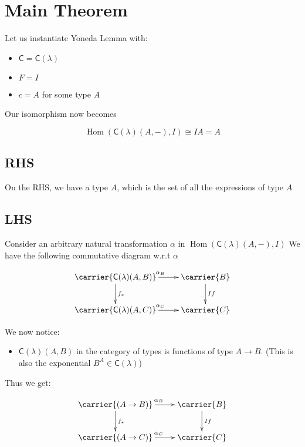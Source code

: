 \documentclass[11pt]{article}
\begin{document}
\section{Main Theorem}
\label{sec:orgbb482da}

Let us instantiate Yoneda Lemma with:
\begin{itemize}
\item \(\mathsf C = \mathsf C (\lambda)\)
\item \(F = I\)
\item \(c = A\) for some type \(A\)
\end{itemize}

Our isomorphism now becomes

\[\operatorname{Hom}(\mathsf C (\lambda) (A, {-}), I) \cong I A = A \]

\subsection{RHS}
\label{sec:org1dd8122}
On the RHS, we have a type \(A\), which is the set of all the expressions of type \(A\)

\subsection{LHS}
\label{sec:org2f2fb4e}
Consider an arbitrary natural transformation \(\alpha\) in \(\operatorname{Hom}(\mathsf C (\lambda) (A, {-}), I)\)
We have the following commutative diagram w.r.t \(\alpha\)

\begin{equation*}
\xymatrix{
\carrier{\mathsf C (\lambda) (A, B)}
\ar[r]^{\alpha_B}^{}
\ar[d]^{f_*}
&
\carrier{B}
\ar[d]^{If}
\\
\carrier{\mathsf C (\lambda) (A, C)}
\ar[r]^{\alpha_C}^{}
&
\carrier{C}
}
\end{equation*}

We now notice:
\begin{itemize}
\item \(\mathsf C (\lambda) (A, B)\) in the category of types is functions of type \(A \to B\). (This is also the exponential \(B^A \in \mathsf C(\lambda)\))
\end{itemize}

Thus we get:

\begin{equation*}
\xymatrix{
\carrier{(A \to B)}
\ar[r]^{\alpha_B}^{}
\ar[d]^{f_*}
&
\carrier{B}
\ar[d]^{If}
\\
\carrier{(A \to C)}
\ar[r]^{\alpha_C}^{}
&
\carrier{C}
}
\end{equation*}
\end{document}
